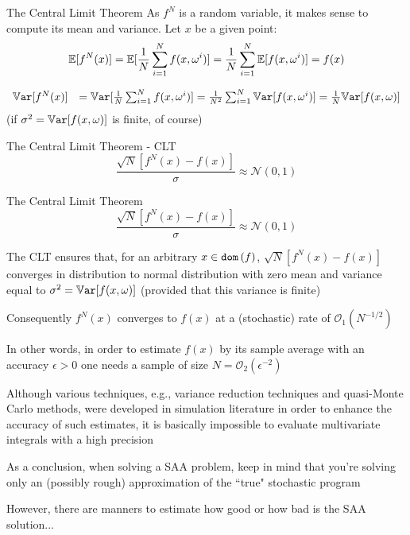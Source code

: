 \begin{frame}{The Central Limit Theorem }
 As $f^N$ is a random variable, it makes sense to compute its mean and variance. Let $x$ be a given point:
\[
\mathbb{E}[f^N(x)] = \mathbb{E}[\frac{1}{N}\sum_{i=1}^N f(x,\omega^i)]= \frac{1}{N}\sum_{i=1}^N \mathbb{E}[f(x,\omega^i)] =f(x)
\]

\pula
\[
\begin{array}{ll}
\mathbb{V}\texttt{ar}[f^N(x)]&= \mathbb{V}\texttt{ar}[\frac{1}{N}\sum_{i=1}^N f(x,\omega^i)]=  \frac{1}{N^2}\sum_{i=1}^N \mathbb{V}\texttt{ar}[f(x,\omega^i)]= \frac{1}{N} \mathbb{V}\texttt{ar}[f(x,\omega)]
\end{array}
\]
 (if $\sigma^2=\mathbb{V}\texttt{ar}[f(x,\omega)]$ is finite, of course)


\begin{block}{The Central Limit Theorem - CLT}
\[
\frac{\sqrt{N}[f^N(x) - f(x)]}{\sigma}\approx \mathcal{N}(0,1)
\]
\end{block}
 \end{frame}


\begin{frame}{The Central Limit Theorem }
\[
\frac{\sqrt{N}[f^N(x) - f(x)]}{\sigma}\approx \mathcal{N}(0,1)
\]
\pula

The CLT ensures that, for an arbitrary $x \in {\tt dom}\, (f)$, $\sqrt{N}[f^N(x) - f(x)]$
converges in distribution to normal distribution with zero mean and variance equal to $\sigma^2=\mathbb{V}\texttt{ar}[f(x,\omega)]$ (provided that this variance is finite)
\pula

Consequently $f^N(x)$ converges to $f(x)$ at a (stochastic) rate of $\mathcal{O}_1(N^{-1/2})$
\pula

In other words, in order to estimate $f(x)$ by its sample average with an
accuracy $\epsilon>0$ one needs a sample of size $N = \mathcal{O}_2(\epsilon^{-2})$
\pula

Although various techniques, e.g., variance reduction techniques and quasi-Monte Carlo
methods, were developed in simulation literature in order to enhance the
accuracy of such estimates,  it is basically impossible to evaluate multivariate integrals with
a high precision
\pula

As a conclusion, when solving a SAA problem, keep in mind that you're solving only an (possibly rough) approximation of the ``true" stochastic program

\pula
However, there are manners to estimate how good or how bad is the SAA solution...

 \end{frame}

